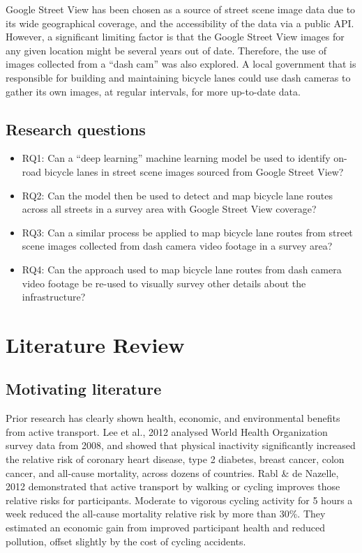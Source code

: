 \documentclass[11pt,twoside]{report}
\begin{document}
Google Street View has been chosen as a source of street scene image data due to its wide geographical coverage, and the accessibility of the data via a public API.  However, a significant limiting factor is that the Google Street View images for any given location might be several years out of date.  Therefore, the use of images collected from a ``dash cam'' was also explored.  A local government that is responsible for building and maintaining bicycle lanes could use dash cameras to gather its own images, at regular intervals, for more up-to-date data.

\section{Research questions}
\begin{itemize}
\item{RQ1: Can a ``deep learning'' machine learning model be used to identify on-road bicycle lanes in street scene images sourced from Google Street View?}
\item{RQ2: Can the model then be used to detect and map bicycle lane routes across all streets in a survey area with Google Street View coverage?}
\item{RQ3: Can a similar process be applied to map bicycle lane routes from street scene images collected from dash camera video footage in a survey area?}
\item{RQ4: Can the approach used to map bicycle lane routes from dash camera video footage be re-used to visually survey other details about the infrastructure?}
\end{itemize}


\chapter{Literature Review}


\section{Motivating literature}

Prior research has clearly shown health, economic, and environmental benefits from active transport.  Lee et al., 2012 \cite{LEE2012219} analysed World Health Organization survey data from 2008, and showed that physical inactivity significantly increased the relative risk of coronary heart disease, type 2 diabetes, breast cancer, colon cancer, and all-cause mortality, across dozens of countries.  Rabl \& de Nazelle, 2012 \cite{RABL2012121} demonstrated that active transport by walking or cycling improves those relative risks for participants.  Moderate to vigorous cycling activity for 5 hours a week reduced the all-cause mortality relative risk by more than 30\%.  They estimated an economic gain from improved participant health and reduced pollution, offset slightly by the cost of cycling accidents.
\end{document}
